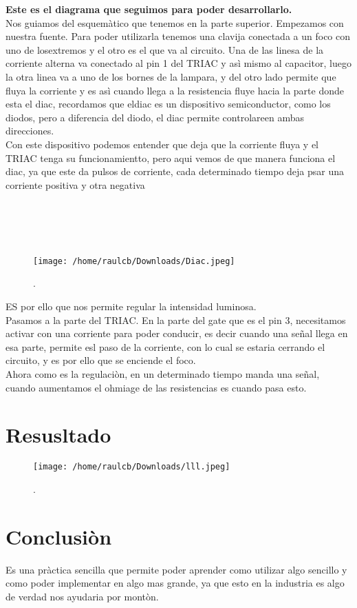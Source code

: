 \documentclass[11pt]{article}
\begin{document}
\textbf{Este es el diagrama que seguimos para poder desarrollarlo.}
\\
Nos guiamos del esquemàtico que tenemos en la parte superior.
Empezamos con nuestra fuente. Para poder utilizarla tenemos una clavija conectada a un foco con uno de losextremos y el otro es el que va al circuito. Una de las linesa de la corriente alterna va conectado al pin 1 del TRIAC y asì mismo al capacitor, luego la otra linea va a uno de los bornes de la lampara, y del otro lado permite que fluya la corriente y es asì cuando llega a la resistencia fluye hacia la parte donde esta el diac, recordamos que eldiac es un dispositivo semiconductor, como los diodos, pero a diferencia del diodo, el diac permite controlareen ambas direcciones.
\\
Con este dispositivo podemos entender que deja que la corriente fluya y el TRIAC tenga su funcionamientto, pero aqui vemos de que manera funciona el diac, ya que este da pulsos de corriente, cada determinado tiempo deja psar una corriente positiva y otra negativa 
\\\\\\\\\\

\begin{figure}[htp]
\centering
\texttt{[image: /home/raulcb/Downloads/Diac.jpeg]}
\caption{.}
\label{.}
\end{figure}

ES por ello que nos permite regular la intensidad luminosa.
\\

Pasamos a la parte del TRIAC.
En la parte del gate que es el pin 3, necesitamos activar con una corriente para poder conducir, es decir cuando una señal llega en esa parte, permite esl paso de la corriente, con lo cual se estaria cerrando el circuito, y es por ello que se enciende el foco.
\\
Ahora como es la regulaciòn, en un determinado tiempo manda una señal, cuando aumentamos el ohmiage de las resistencias es cuando pasa esto.
\section{Resusltado}
\begin{figure}[htp]
\centering
\texttt{[image: /home/raulcb/Downloads/lll.jpeg]}
\caption{.}
\label{.}
\end{figure}  

\section{Conclusiòn}
Es una pràctica sencilla que permite poder aprender como utilizar algo sencillo y como poder implementar en algo mas grande, ya que esto en la industria es algo de verdad nos ayudaria por montòn.
\end{document}
